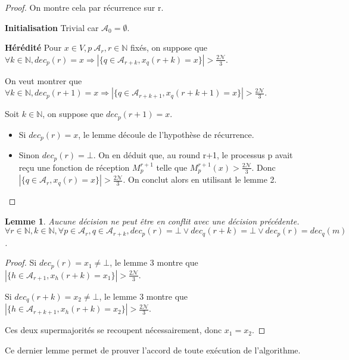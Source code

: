 \documentclass{article}
\newtheorem{lemma}{Lemme}
\begin{document}
\begin{proof}

On montre cela par récurrence sur r.

\textbf{Initialisation}
	Trivial car $\mathcal{A}_0 = \emptyset$.

\textbf{Hérédité}
	Pour $x \in V, p \ \mathcal{A}_r, r \in \mathds{N}$ fixés, on suppose que 
	$ \forall k \in \mathds{N}, dec_p(r) = x \Rightarrow| \{ q \in \mathcal{A}_{r+k} , x_q(r+k) = x \} | > \frac{2\mathcal{N}}{3}$.

	On veut montrer que 
	$ \forall k \in \mathds{N}, dec_p(r+1) = x \Rightarrow| \{ q \in \mathcal{A}_{r+k+1} , x_q(r+k+1) = x \} | > \frac{2\mathcal{N}}{3}$.

	Soit $k \in \mathds{N}$, on suppose que $dec_p(r+1) = x$.

	\begin{itemize}

		\item Si $dec_p(r) = x$, le lemme découle de l'hypothèse de récurrence.
		\item Sinon $dec_p(r) = \bot$. On en déduit que, au round r+1, le processus p avait reçu une fonction de réception $M_p^{r+1}$ telle que $M_p^{r+1}(x) > \frac{2\mathcal{N}}{3}$.
			Donc $| \{ q \in \mathcal{A}_r , x_q(r) = x \} | > \frac{2\mathcal{N}}{3}$.
			On conclut alors en utilisant le lemme 2.

	\end{itemize}
\end{proof}

\begin{lemma}
	Aucune décision ne peut être en conflit avec une décision précédente.
	$ \forall r \in \mathds{N}, k \in \mathds{N}, \forall p \in \mathcal{A}_r, q \in \mathcal{A}_{r+k},dec_p(r) = \bot \vee dec_q(r+k) = \bot \vee dec_p(r) = dec_q(m)$.
\end{lemma}
\begin{proof}

	Si $dec_p(r) = x_1 \neq \bot$,   le lemme 3 montre que $|\{h \in \mathcal{A}_{r+1}, x_h(r+k) = x_1\}| > \frac{2\mathcal{N}}{3}$.

	Si $dec_q(r+k) = x_2 \neq \bot$,   le lemme 3 montre que $|\{h \in \mathcal{A}_{r+k+1}, x_h(r+k) = x_2\}|> \frac{2\mathcal{N}}{3}$.

Ces deux supermajorités se recoupent nécessairement, donc $x_1 = x_2$.
\end{proof}

Ce dernier lemme permet de prouver l'accord de toute exécution de l'algorithme.
\end{document}
